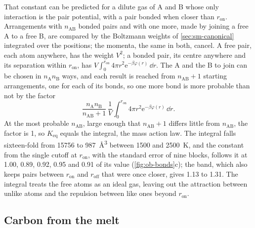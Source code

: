 That constant can be predicted for a dilute gas of A and B whose only
interaction is the pair potential, with a pair bonded when closer than
$r_{\mathrm{on}}$. Arrangements with $n_{\mathrm{AB}}$ bonded pairs and
with one more, made by joining a free A to a free B, are compared by the
Boltzmann weights of \cref{sec:sm-canonical} integrated over the
positions; the momenta, the same in both, cancel. A free pair, each atom
anywhere, has the weight $V^2$; a bonded pair, its centre anywhere and
its separation within $r_{\mathrm{on}}$, has $V\int_0^{r_{\mathrm{on}}}4\pi
r^2\mathrm{e}^{-\beta\varphi(r)}\,\dd r$. The A and the B to join can be
chosen in $n_{\mathrm A}n_{\mathrm B}$ ways, and each result is reached
from $n_{\mathrm{AB}} + 1$ starting arrangements, one for each of its
bonds, so one more bond is more probable than not by the factor
\begin{equation*}
   \frac{n_{\mathrm A}n_{\mathrm B}}{n_{\mathrm{AB}} + 1}\,\frac1V
   \int_0^{r_{\mathrm{on}}}4\pi r^2\mathrm{e}^{-\beta\varphi(r)}\,\dd r .
\end{equation*}
At the most probable $n_{\mathrm{AB}}$, large enough that $n_{\mathrm{AB}} +
1$ differs little from $n_{\mathrm{AB}}$, the factor is 1, so
$K_{\mathrm{eq}}$ equals the integral, the mass action law. The integral falls
sixteen-fold from \num{15756} to \SI{987}{\angstrom\cubed} between 1500
and \SI{2500}{\kelvin}, and the constant from the single cutoff at
$r_{\mathrm{on}}$, with the standard error of nine blocks, follows it at
1.00, 0.89, 0.92, 0.95 and 0.91 of its value (\cref{fig:ob-bonds}c); the
band, which also keeps pairs between $r_{\mathrm{on}}$ and $r_{\mathrm{off}}$
that were once closer, gives 1.13 to 1.31. The integral treats the free
atoms as an ideal gas, leaving out the attraction between unlike atoms
and the repulsion between like ones beyond $r_{\mathrm{on}}$.

\subsection*{Carbon from the melt}

